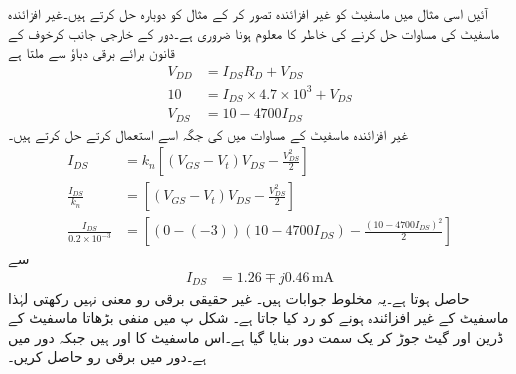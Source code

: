آئیں اسی مثال میں ماسفیٹ کو غیر افزائندہ تصور کر کے مثال کو دوبارہ حل کرتے ہیں۔غیر افزائندہ ماسفیٹ کی مساوات حل کرنے کی خاطر   کا معلوم ہونا ضروری ہے۔دور کے خارجی جانب کرخوف کے قانون برائے برقی دباؤ سے ملتا ہے
\begin{align*}
V_{DD}&=I_{DS} R_D+V_{DS}\\
10&=I_{DS} \times 4.7 \times 10^{3}+V_{DS}\\
V_{DS}&=10-4700 I_{DS}
\end{align*}
غیر افزائندہ ماسفیٹ کے مساوات میں  کی جگہ اسے استعمال کرتے حل کرتے ہیں۔
\begin{align*}
I_{DS}&=k_n \left[\left(V_{GS}-V_t \right )V_{DS} -\frac{V_{DS}^{2}}{2}\right ]\\
\frac{I_{DS}}{k_n}&=\left[\left(V_{GS}-V_t \right )V_{DS} -\frac{V_{DS}^{2}}{2}\right ]\\
\frac{I_{DS}}{0.2 \times 10^{-3}}&=\left[\left(0-(-3) \right ) \left(10-4700 I_{DS} \right )- \frac{\left( 10-4700 I_{DS} \right )^{2}}{2}\right]
\end{align*}
سے
\begin{align*}
I_{DS}&=1.26\mp j 0.46 \,\si{\milli \ampere}
\end{align*}
حاصل ہوتا ہے۔یہ مخلوط جوابات ہیں۔ غیر حقیقی برقی رو معنی نہیں رکھتی لہٰذا ماسفیٹ کے غیر افزائندہ ہونے کو رد کیا جاتا ہے۔
 
شکل  پ میں منفی بڑھاتا ماسفیٹ کے ڈرین اور گیٹ جوڑ کر یک سمت دور بنایا گیا ہے۔اس ماسفیٹ کا  اور  ہیں  جبکہ دور میں   ہے۔دور میں برقی رو حاصل کریں۔


